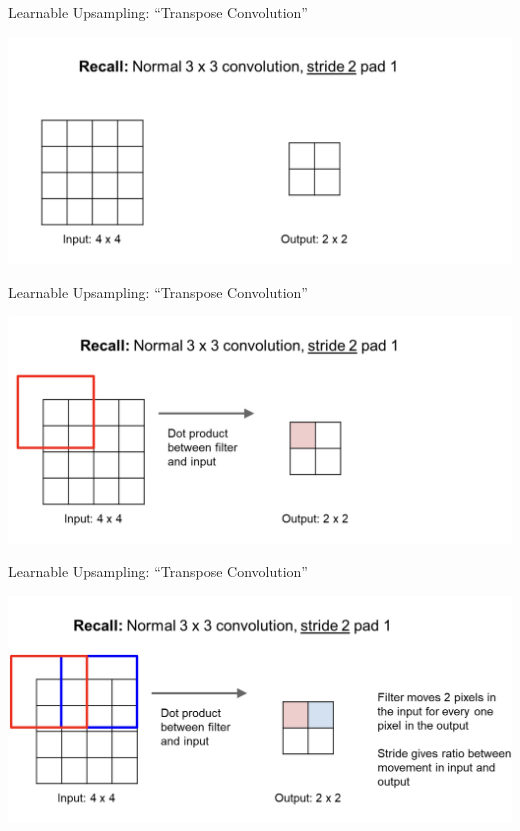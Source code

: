 \documentclass[serif, aspectratio=169]{beamer}
\begin{document}
\begin{frame}{Learnable Upsampling: “Transpose Convolution”}

    \begin{center}
        \includegraphics[width=\textwidth]{pic/Transpose conv eg4.png} 
    \end{center}
\end{frame}

\begin{frame}{Learnable Upsampling: “Transpose Convolution”}

    \begin{center}
        \includegraphics[width=\textwidth]{pic/Transpose conv eg5.png} 
    \end{center}
\end{frame}

\begin{frame}{Learnable Upsampling: “Transpose Convolution”}

    \begin{center}
        \includegraphics[width=\textwidth]{pic/Transpose conv eg6.png} 
    \end{center}
\end{frame}
\end{document}
